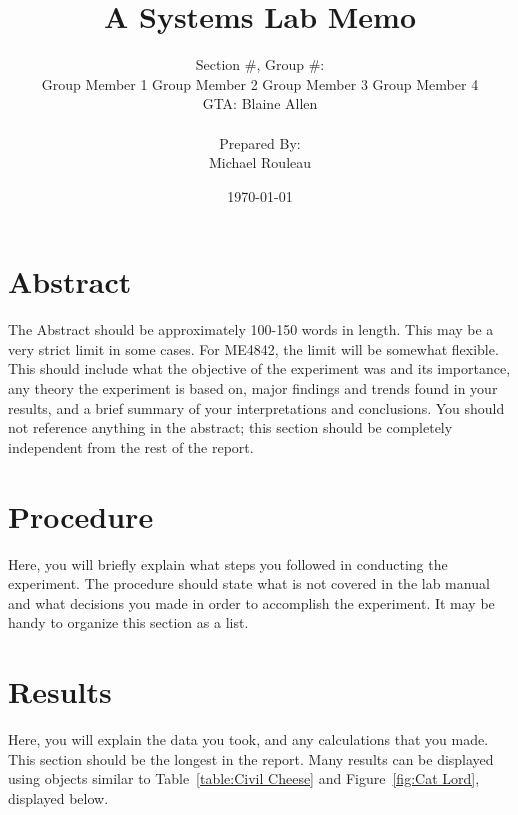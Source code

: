 \documentclass[11pt,a4paper]{article}
\title{\Huge A Systems Lab Memo}
\author{Section \#, Group \#: \\
  Group Member 1 \quad Group Member 2 \quad Group Member 3 \quad Group Member 4 \\ GTA: Blaine Allen \\\\ Prepared By: \\ Michael Rouleau}
\date{\today}
\begin{document}
\null  %
\nointerlineskip  %
\vfill
\let\snewpage \newpage
\let\newpage \relax
\maketitle
\let \newpage \snewpage
\vfill 
\break %

\section*{Abstract}
The Abstract should be approximately 100-150 words in length. This may be a very strict limit in some cases. For ME4842, the limit will be somewhat flexible. This should include what the objective of the experiment was and its importance, any theory the experiment is based on, major findings and trends found in your results, and a brief summary of your interpretations and conclusions. You should not reference anything in the abstract; this section should be completely independent from the rest of the report.

\section*{Procedure}
Here, you will briefly explain what steps you followed in conducting the experiment. The procedure should state what is not covered in the lab manual and what decisions you made in order to accomplish the experiment. It may be handy to organize this section as a list.

\section*{Results}
Here, you will explain the data you took, and any calculations that you made. This section should be the longest in the report. Many results can be displayed using objects similar to  Table~\ref{table:Civil Cheese} and Figure~\ref{fig:Cat Lord}, displayed below.

\end{document}
